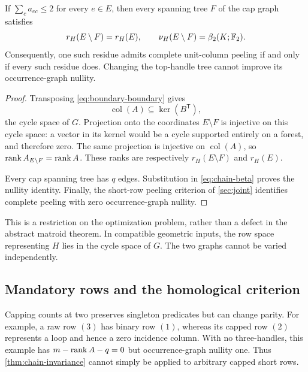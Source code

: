 \begin{theorem}
\label{thm:chain-invariance}
If $\sum_c a_{ec}\leq2$ for every $e\in E$, then every spanning tree $F$ of
the cap graph satisfies
\begin{equation}
 r_H(E\setminus F)=r_H(E),\qquad
 \nu_H(E\setminus F)=\beta_2(K;\mathbb F_2).
 \label{eq:tree-invariance}
\end{equation}
Consequently, one such residue admits complete unit-column peeling if and
only if every such residue does. Changing the top-handle tree cannot
improve its occurrence-graph nullity.
\end{theorem}

\begin{proof}
Transposing \cref{eq:boundary-boundary} gives
\[
 \operatorname{col}(A)\subseteq\ker(B^{\mathsf T}),
\]
the cycle space of $G$. Projection onto the coordinates $E\setminus F$ is
injective on this cycle space: a vector in its kernel would be a cycle
supported entirely on a forest, and therefore zero. The same projection
is injective on $\operatorname{col}(A)$, so $\operatorname{rank} A_{E\setminus F}=\operatorname{rank} A$.
These ranks are respectively $r_H(E\setminus F)$ and $r_H(E)$.

Every cap spanning tree has $q$ edges. Substitution in
\cref{eq:chain-beta} proves the nullity identity. Finally, the short-row
peeling criterion of \cref{sec:joint} identifies complete peeling with
zero occurrence-graph nullity.
\end{proof}

This is a restriction on the optimization problem, rather than a defect
in the abstract matroid theorem. In compatible geometric inputs, the row
space representing $H$ lies in the cycle space of $G$. The two graphs
cannot be varied independently.

\subsection{Mandatory rows and the homological criterion}

Capping counts at two preserves singleton predicates but can change
parity. For example, a raw row $(3)$ has binary row $(1)$, whereas its
capped row $(2)$ represents a loop and hence a zero incidence column.
With no three-handles, this example has $m-\operatorname{rank} A-q=0$ but occurrence-graph
nullity one. Thus \cref{thm:chain-invariance} cannot simply be applied to
arbitrary capped short rows.

